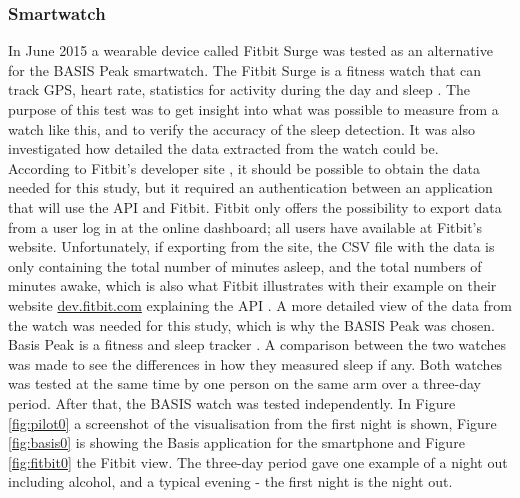 \documentclass[12pt]{article} %
\begin{document}
\subsubsection{Smartwatch}
In June 2015 a wearable device called Fitbit Surge was tested as an alternative for the BASIS Peak smartwatch. The Fitbit Surge is a fitness watch that can track GPS, heart rate, statistics for activity during the day and sleep \cite{fitbit}. The purpose of this test was to get insight into what was possible to measure from a watch like this, and to verify the accuracy of the sleep detection. It was also investigated how detailed the data extracted from the watch could be.  \\

According to Fitbit's developer site \cite{fitbit_dev}, it should be possible to obtain the data needed for this study, but it required an authentication between an application that will use the API and Fitbit. Fitbit only offers the possibility to export data from a user log in at the online dashboard; all users have available at Fitbit's website. Unfortunately, if exporting from the site, the CSV file with the data is only containing the total number of minutes asleep, and the total numbers of minutes awake, which is also what Fitbit illustrates with their example on their website \url{dev.fitbit.com} explaining the API \cite{fitbit_dev}. A more detailed view of the data from the watch was needed for this study, which is why the BASIS Peak was chosen.\\

Basis Peak is a fitness and sleep tracker \cite{basis}. A comparison between the two watches was made to see the differences in how they measured sleep if any. Both watches was tested at the same time by one person on the same arm over a three-day period. After that, the BASIS watch was tested independently. In Figure \ref{fig:pilot0} a screenshot of the visualisation from the first night is shown, Figure \ref{fig:basis0} is showing the Basis application for the smartphone and Figure \ref{fig:fitbit0} the Fitbit view. The three-day period gave one example of a night out including alcohol, and a typical evening - the first night is the night out. 
\end{document}
